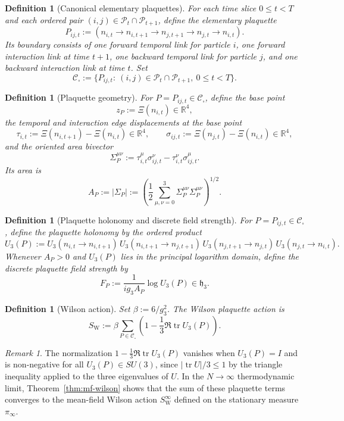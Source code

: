 \documentclass[11pt]{article}
\newtheorem{definition}[theorem]{Definition}
\theoremstyle{remark}
\newtheorem{remark}[theorem]{Remark}
\newcommand{\R}{\mathbb R}
\newcommand{\tr}{\operatorname{tr}}
\newcommand{\mathfrakh}{\mathfrak h_3}
\begin{document}
\begin{definition}[Canonical elementary plaquettes]
\label{def:plaquettes}
For each time slice $0\le t<T$ and each ordered pair
$(i,j)\in\mathcal P_t\cap\mathcal P_{t+1}$, define the elementary plaquette
\[
P_{ij,t}:=(n_{i,t}\to n_{i,t+1}\to n_{j,t+1}\to n_{j,t}\to n_{i,t}).
\]
Its boundary consists of one forward temporal link for particle $i$, one forward
interaction link at time $t+1$, one backward temporal link for particle $j$,
and one backward interaction link at time $t$.
Set
\[
\mathcal C_\square:=\{P_{ij,t}:\ (i,j)\in\mathcal P_t\cap\mathcal P_{t+1},\ 0\le t<T\}.
\]
\end{definition}

\begin{definition}[Plaquette geometry]
\label{def:plaquette-geometry}
For $P=P_{ij,t}\in\mathcal C_\square$, define the base point
\[
z_P:=\Xi(n_{i,t})\in\R^4,
\]
the temporal and interaction edge displacements at the base point
\[
\tau_{i,t}:=\Xi(n_{i,t+1})-\Xi(n_{i,t})\in\R^4,
\qquad
\sigma_{ij,t}:=\Xi(n_{j,t})-\Xi(n_{i,t})\in\R^4,
\]
and the oriented area bivector
\[
\Sigma_P^{\mu\nu}:=\tau_{i,t}^\mu\sigma_{ij,t}^\nu-\tau_{i,t}^\nu\sigma_{ij,t}^\mu.
\]
Its area is
\[
A_P:=|\Sigma_P|:=\left(\frac12\sum_{\mu,\nu=0}^3
\Sigma_P^{\mu\nu}\Sigma_P^{\mu\nu}\right)^{1/2}.
\]
\end{definition}

\begin{definition}[Plaquette holonomy and discrete field strength]
\label{def:plaquette-field-strength}
For $P=P_{ij,t}\in\mathcal C_\square$, define the plaquette holonomy by the
ordered product
\[
U_3(P):=
U_3(n_{i,t}\to n_{i,t+1})\,
U_3(n_{i,t+1}\to n_{j,t+1})\,
U_3(n_{j,t+1}\to n_{j,t})\,
U_3(n_{j,t}\to n_{i,t}).
\]
Whenever $A_P>0$ and $U_3(P)$ lies in the principal logarithm domain, define the
discrete plaquette field strength by
\[
F_P:=\frac{1}{i g_3 A_P}\log U_3(P)\in\mathfrakh.
\]
\end{definition}

\begin{definition}[Wilson action]
\label{def:action}
Set $\beta:=6/g_3^2$.
The Wilson plaquette action is
\[
S_{\mathrm W}:=\beta\sum_{P\in\mathcal C_\square}\left(1-\frac13\Re\tr U_3(P)\right).
\]
\end{definition}

\begin{remark}
The normalization $1-\frac{1}{3}\Re\tr U_3(P)$ vanishes when $U_3(P)=I$ and is
non-negative for all $U_3(P)\in SU(3)$, since
$|\tr U|/3\le1$ by the triangle inequality applied to the three eigenvalues of $U$.
In the $N\to\infty$ thermodynamic limit, Theorem~\ref{thm:mf-wilson} shows that
the sum of these plaquette terms converges to the mean-field Wilson action
$S_{\mathrm W}^\infty$ defined on the stationary measure $\pi_\infty$.
\end{remark}
\end{document}
